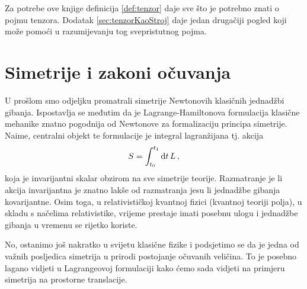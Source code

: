 Za potrebe ove knjige definicija \ref{def:tenzor} daje sve što
je potrebno znati o pojmu tenzora. Dodatak \ref{sec:tenzorKaoStroj} daje
jedan drugačiji pogled koji može pomoći u razumijevanju tog
svepristutnog pojma.


\section{Simetrije i zakoni očuvanja}
\label{sec:noether}

U prošlom smo odjeljku promatrali simetrije Newtonovih klasičnih jednadžbi
gibanja. Ispostavlja se međutim da je
Lagrange-Hamiltonova formulacija klasične mehanike znatno pogodnija od
Newtonove za formalizaciju principa simetrije. 
Naime, centralni objekt te formulacije je integral lagranžijana tj. akcija
\begin{equation}
S = \int_{t_0}^{t_1} \textrm{d} t\, L \,,
\label{eq:akcija}
\end{equation}
koja je invarijantni skalar obzirom na sve simetrije teorije. Razmatranje
je li akcija invarijantna je znatno lakše od razmatranja jesu li jednadžbe
gibanja kovarijantne. Osim toga, u relativističkoj kvantnoj fizici
(kvantnoj teoriji polja), u skladu s načelima relativistike,
vrijeme prestaje imati posebnu ulogu i jednadžbe gibanja
u vremenu se rijetko koriste. 

No, ostanimo još nakratko u svijetu klasične fizike i podsjetimo se da je jedna
od važnih posljedica simetrija u prirodi postojanje očuvanih veličina.
To je posebno lagano vidjeti u Lagrangeovoj formulaciji kako ćemo sada
vidjeti na primjeru simetrija na prostorne translacije.

